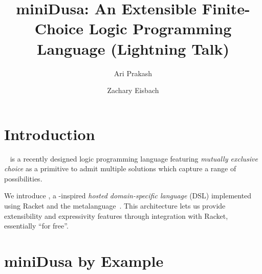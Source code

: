 \documentclass[dvipsnames,sigplan,screen,review,anonymous,acmthm,nonacm]{acmart}
\begin{document}
\title{miniDusa: An Extensible Finite-Choice Logic Programming Language (Lightning Talk)}



\author{Ari Prakash}


\author{Zachary Eisbach}
\authornotemark[1]


\maketitle

\section{Introduction}

\Dusa{}~\cite{martens2025dusa} %
is a recently designed logic programming language featuring
\emph{mutually exclusive choice} as a primitive 
to admit multiple solutions which
capture a range of possibilities.

We introduce \miniDusa{}, a \Dusa{}-inspired
\emph{hosted domain-specific language} (DSL) implemented using Racket and
the \syntaxspec{} metalanguage~\cite{ballantyne2024pearl}. %
This architecture lets us provide extensibility and expressivity features
through integration with Racket, essentially ``for free''.

\section{miniDusa by Example}
\end{document}
